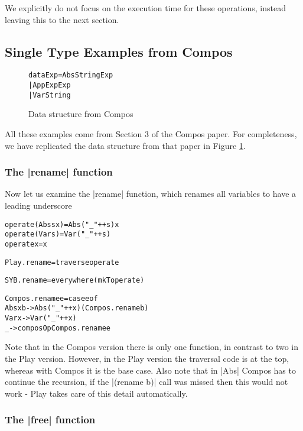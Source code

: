 \documentclass[preprint]{sigplanconf}
\newenvironment{code}{\begin{alltt}\small}{\end{alltt}}
\begin{document}
We explicitly do not focus on the execution time for these operations, instead leaving this to the next section.

\subsection{Single Type Examples from Compos}

\begin{figure}
\begin{code}
data Exp = Abs String Exp
         | App Exp Exp
         | Var String
\end{code}
\caption{Data structure from Compos}
\label{fig:compos1}
\end{figure}

All these examples come from Section 3 of the Compos paper. For completeness, we have replicated the data structure from that paper in Figure \ref{fig:compos1}.

\subsubsection{The |rename| function}

Now let us examine the |rename| function, which renames all variables to have a leading underscore

\begin{code}
operate (Abs  s x  )  = Abs  ("_" ++ s) x
operate (Var  s    )  = Var  ("_" ++ s)
operate x             = x

Play.rename = traverse operate

SYB.rename = everywhere (mkT operate)

Compos.rename e = case e of
    Abs x b  -> Abs ("_" ++ x) (Compos.rename b)
    Var x    -> Var ("_" ++ x)
    _        -> composOp Compos.rename e
\end{code}

Note that in the Compos version there is only one function, in contrast to two in the Play version. However, in the Play version the traversal code is at the top, whereas with Compos it is the base case. Also note that in |Abs| Compos has to continue the recursion, if the |(rename b)| call was missed then this would not work - Play takes care of this detail automatically.

\subsubsection{The |free| function}
\end{document}
